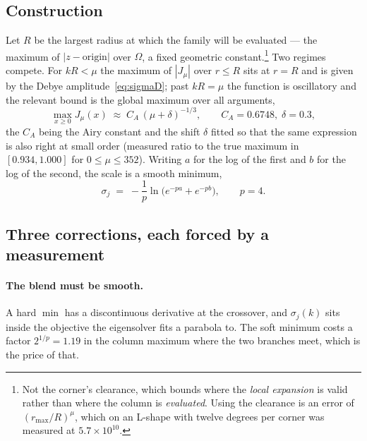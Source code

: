\documentclass[11pt]{article}
\theoremstyle{remark}
\begin{document}
\subsection{Construction}

Let $R$ be the largest radius at which the family will be evaluated --- the maximum of
$|z-\text{origin}|$ over $\Omega$, a fixed geometric constant.\footnote{Not the corner's
clearance, which bounds where the \emph{local expansion} is valid rather than where the
column is \emph{evaluated}. Using the clearance is an error of $(r_{\max}/R)^\mu$, which on
an L-shape with twelve degrees per corner was measured at $5.7\times10^{10}$.} Two regimes
compete. For $kR<\mu$ the maximum of $|J_\mu|$ over $r\le R$ sits at $r=R$ and is given by
the Debye amplitude~\eqref{eq:sigmaD}; past $kR=\mu$ the function is oscillatory and the
relevant bound is the global maximum over all arguments,
\[
  \max_{x\ge0} J_\mu(x) \;\approx\; C_A\,(\mu+\delta)^{-1/3},
  \qquad C_A=0.6748,\;\delta=0.3,
\]
the $C_A$ being the Airy constant and the shift $\delta$ fitted so that the same expression
is also right at small order (measured ratio to the true maximum in $[0.934,1.000]$ for
$0\le\mu\le352$). Writing $a$ for the log of the first and $b$ for the log of the second, the
scale is a smooth minimum,
\begin{equation}
  \sigma_j \;=\; -\frac{1}{p}\ln\!\big(e^{-pa}+e^{-pb}\big),\qquad p=4 .
  \label{eq:softmin}
\end{equation}

\subsection{Three corrections, each forced by a measurement}

\paragraph{The blend must be smooth.} A hard $\min$ has a discontinuous derivative at the
crossover, and $\sigma_j(k)$ sits inside the objective the eigensolver fits a parabola to. The
soft minimum costs a factor $2^{1/p}=1.19$ in the column maximum where the two branches meet,
which is the price of that.
\end{document}
